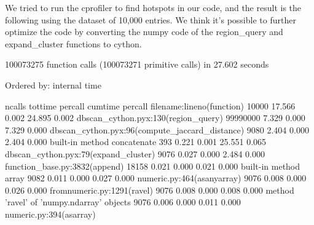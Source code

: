 \documentclass{article}
\begin{document}
We tried to run the cprofiler to find hotspots in our code, and the result is the following using the dataset of 10,000 entries.
We think it's possible to further optimize the code by converting the numpy code of the region\_query and expand\_cluster functions to cython.
\begin{pythonOutput}
        100073275 function calls (100073271 primitive calls) in 27.602 seconds

   Ordered by: internal time

   ncalls  tottime  percall  cumtime  percall filename:lineno(function)
    10000   17.566    0.002   24.895    0.002 dbscan_cython.pyx:130(region_query)
 99990000    7.329    0.000    7.329    0.000 dbscan_cython.pyx:96(compute_jaccard_distance)
     9080    2.404    0.000    2.404    0.000 {built-in method concatenate}
      393    0.221    0.001   25.551    0.065 dbscan_cython.pyx:79(expand_cluster)
     9076    0.027    0.000    2.484    0.000 function_base.py:3832(append)
    18158    0.021    0.000    0.021    0.000 {built-in method array}
     9082    0.011    0.000    0.027    0.000 numeric.py:464(asanyarray)
     9076    0.008    0.000    0.026    0.000 fromnumeric.py:1291(ravel)
     9076    0.008    0.000    0.008    0.000 {method 'ravel' of 'numpy.ndarray' objects}
     9076    0.006    0.000    0.011    0.000 numeric.py:394(asarray)

\end{pythonOutput}
\end{document}
